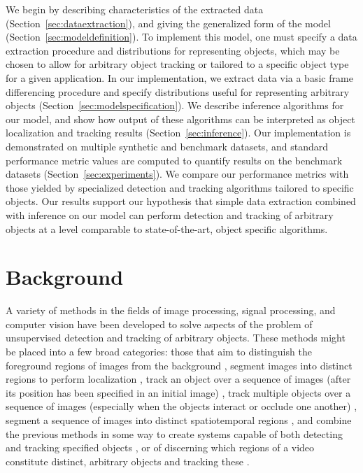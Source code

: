 \documentclass[twocolumn, final]{svjour3}
\begin{document}
We begin by describing characteristics of the extracted data (Section~\ref{sec:dataextraction}), and giving the generalized form of the model (Section~\ref{sec:modeldefinition}). To implement this model, one must specify a data extraction procedure and distributions for representing objects, which may be chosen to allow for arbitrary object tracking or tailored to a specific object type for a given application. In our implementation, we extract data via a basic frame differencing procedure and specify distributions useful for representing arbitrary objects (Section~\ref{sec:modelspecification}). We describe inference algorithms for our model, and show how output of these algorithms can be interpreted as object localization and tracking results (Section~\ref{sec:inference}). Our implementation is demonstrated on multiple synthetic and benchmark datasets, and standard performance metric values are computed to quantify results on the benchmark datasets (Section~\ref{sec:experiments}). We compare our performance metrics with those yielded by specialized detection and tracking algorithms tailored to specific objects. Our results support our hypothesis that simple data extraction combined with inference on our model can perform detection and tracking of arbitrary objects at a level comparable to state-of-the-art, object specific algorithms.




\section{Background}
\label{sec:priorwork}

A variety of methods in the fields of image processing, signal processing, and computer vision have been developed to solve aspects of the problem of unsupervised detection and tracking of arbitrary objects. These methods might be placed into a few broad categories: those that aim to distinguish the foreground regions of images from the background \cite{hong2007real,chien2002efficient, zhang2007moving, kim2002fast}, segment images into distinct regions to perform localization \cite{jain1997object, fei2005bayesian, sivic2005discovering}, track an object over a sequence of images (after its position has been specified in an initial image) \cite{raja_1998, mckenna_1999, jepson_2003, comaniciu_2003, perez_2002}, track multiple objects over a sequence of images (especially when the objects interact or occlude one another) \cite{senior2006appearance, cucchiara2004probabilistic, zhou2003background, han_2004, mckenna2000tracking, dockstader2001multiple}, segment a sequence of images into distinct spatiotemporal regions \cite{brox2003unsupervised, sista2000unsupervised, wang1998unsupervised}, and combine the previous methods in some way to create systems capable of both detecting and tracking specified objects \cite{Okuma04aboosted,eth_biwi_00633,4036928, khan_2004, leibe2008coupled}, or of discerning which regions of a video constitute distinct, arbitrary objects and tracking these \cite{brostow2006unsupervised, brox2010object, fragkiadaki2011detection, pece_2002,paragios2000geodesic}.
\end{document}
